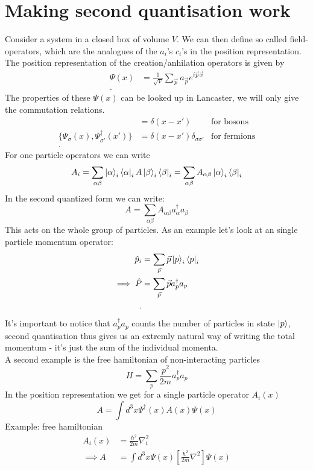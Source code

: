 \documentclass{report}
\begin{document}
\chapter{Making second quantisation work}
Consider a system in a closed box of volume $V$. We can then define so called field-operators, which are the analogues of the $a_i$'s $c_i$'s in the position representation.\\
The position representation of the creation/anhilation operators is given by
\begin{align*}
	\Psi(x) &= \frac{1}{\sqrt{V} } \sum_{\vec{p}} a_{\vec{p}} e^{i \vec{p} \vec{x}} \\
.\end{align*}
The properties of these $\Psi(x)$ can be looked up in Lancaster, we will only give the commutation relations. 
\begin{align*}
	[\Psi(x), \Psi^\dagger(x')] &= \delta(x - x') & \text{for bosons} \\
	\{\Psi_{\sigma}(x), \Psi_{\sigma'}^\dagger(x')\} &= \delta(x - x') \delta_{\sigma \sigma'} & \text{for fermions} \\
.\end{align*}
For one particle operators we can write \[
	A_i = \sum_{\alpha \beta} \ket{\alpha }_i\bra{\alpha }_i A \ket{\beta }_i\bra{\beta }_i = \sum_{\alpha \beta } A_{\alpha \beta } \ket{\alpha }_i \bra{\beta }_i
\] In the second quantized form we can write: \[
A = \sum_{\alpha \beta } A_{\alpha \beta} a_{\alpha}^\dagger a_{\beta}
\] This acts on the whole group of particles.
As an example let's look at an single particle momentum operator:
\begin{align*}
	\hat{p}_i &= \sum_{\vec{p}} \vec{p} \ket{p}_i \bra{p}_i \\
	\implies \hat{P} &= \sum_{\vec{p}} \vec{p} a_p^\dagger a_p \\
.\end{align*}
It's important to notice that $a_p^\dagger a_p$ counts the number of particles in state $\ket{p}$, second quantisation thus gives us an extremly natural way of writing the total momentum - it's just the sum of the individual momenta.\\
A second example is the free hamiltonian of non-interacting particles \[
H = \sum_{p} \frac{p^2}{2m} a_p^\dagger a_p
\] In the position representation we get for a single particle operator $A_i(x)$ \[
A = \int d^3x \Psi^\dagger(x) A(x) \Psi(x)
\] 
Example: free hamiltonian 
\begin{align*}
	A_i(x) &= \frac{\hbar^2}{2m} \nabla_i^2 \\
	\implies A &= \int d^3x \Psi(x) \left[ \frac{\hbar^2}{2m} \nabla^2  \right] \Psi(x)
\end{align*}
\end{document}
